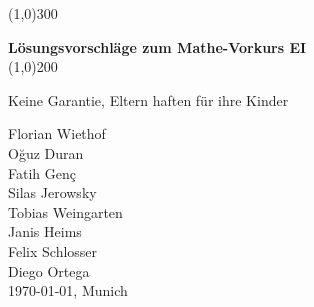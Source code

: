 \begin{titlepage}
	\vspace*{\fill}
	\begin{center}
		\color{gray}\line(1,0){300} \\
		\color{black}
		\vspace{1cm}

		\huge{\bfseries Lösungsvorschläge zum Mathe-Vorkurs EI} \\
		[0.15in]
		\color{gray}\line(1,0){200} \\
		\color{black}

		\vspace{0.5cm}
		\begin{minipage}{8cm}
			\begin{center}
				\large{Keine Garantie, Eltern haften für ihre Kinder}
			\end{center}
		\end{minipage}	
	\end{center}
	\vspace*{\fill}
	\vspace{3cm}
	
	\begin{flushright}
		Florian Wiethof \\
		O\u{g}uz Duran \\
		Fatih Gen\c{c} \\
		Silas Jerowsky \\
		Tobias Weingarten \\
		Janis Heims \\
		Felix Schlosser \\
		Diego Ortega \\
		\today, Munich
	\end{flushright}
\end{titlepage}



\tableofcontents
{}
\thispagestyle{empty}
\clearpage
\setcounter{page}{1}

